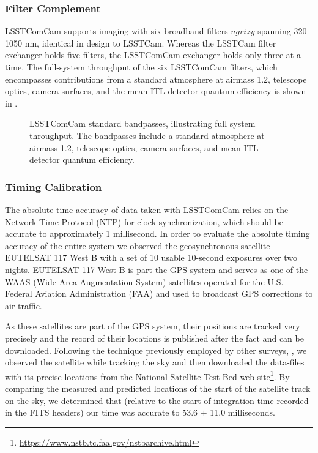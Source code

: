 \subsubsection{Filter Complement}
\label{sssec:comcam_filters}
\gls{LSSTComCam} supports imaging with six broadband filters $ugrizy$ spanning 320--1050 nm, identical in design to LSSTCam.
Whereas the LSSTCam filter exchanger holds five filters, the LSSTComCam exchanger holds only three at a time.
The full-system throughput of the six LSSTComCam filters, which encompasses contributions from a standard atmosphere at airmass 1.2, telescope optics,
camera surfaces, and the mean ITL detector quantum efficiency is shown in .
\begin{figure}[htb!]
\caption{LSSTComCam standard bandpasses, illustrating full system throughput. The bandpasses include a standard atmosphere at airmass 1.2, telescope optics, camera surfaces, and mean ITL detector quantum efficiency.}
\label{fig:comcam_standard_bandpasses}
\end{figure}

\subsubsection{Timing Calibration}
\label{ssec:comcam_timing}

The absolute time accuracy of data taken with \gls{LSSTComCam} relies on the Network Time Protocol (NTP) for clock synchronization, which should be accurate to approximately 1 millisecond.
In order to evaluate the absolute timing accuracy of the entire system we observed the geosynchronous satellite EUTELSAT 117 West B with a set of 10 usable 10-second exposures over two nights.
EUTELSAT 117 West B is part the GPS system and serves as one of the WAAS (Wide Area Augmentation System) satellites operated for the U.S. Federal Aviation Administration (FAA) and used to broadcast GPS corrections to air traffic.

As these satellites are part of the GPS system, their positions are tracked very precisely and the record of their locations is published after the fact and can be downloaded.
Following the technique previously employed by other surveys, \citep{2018PASP..130f4505T},  we observed the satellite while tracking the sky and then downloaded the data-files
with its precise locations from the National Satellite Test Bed web site\footnote{\url{https://www.nstb.tc.faa.gov/nstbarchive.html}}.
By comparing the measured and predicted locations of the start of the satellite track on the sky, we determined that (relative to the start of integration-time recorded in the FITS headers) our time was accurate to 53.6 $\pm$ 11.0 milliseconds.

